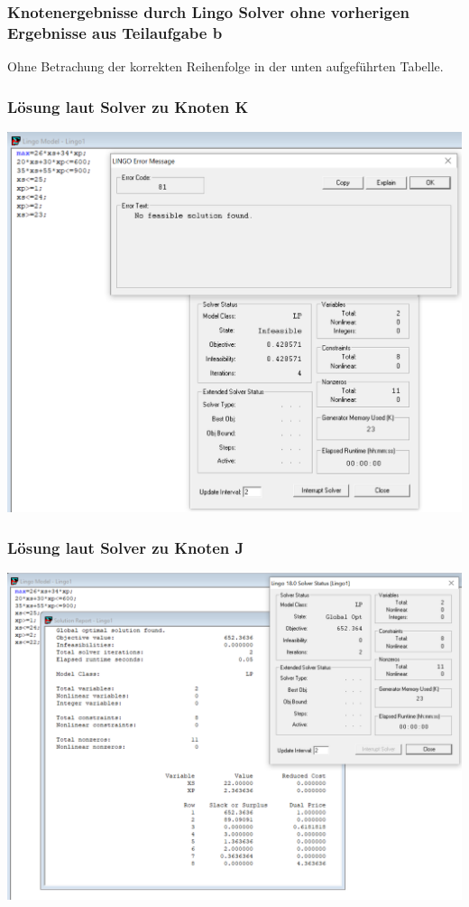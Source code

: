 \documentclass[a4paper,11pt]{article}
\begin{document}
\subsubsection*{Knotenergebnisse durch Lingo Solver ohne vorherigen Ergebnisse aus Teilaufgabe b}
Ohne Betrachung der korrekten Reihenfolge in der unten aufgeführten Tabelle.
\subsubsection*{Lösung laut Solver zu Knoten K}
\begin{centering}
	\includegraphics[width=0.65\linewidth]{src/blatt_5_aufgabe_2_teilaufgabe_c_knoten_k_loesung_solver.png}
\end{centering}

\subsubsection*{Lösung laut Solver zu Knoten J}
\begin{centering}
	\includegraphics[width=0.65\linewidth]{src/blatt_5_aufgabe_2_teilaufgabe_c_knoten_j_loesung_solver.png}
\end{centering}
\end{document}
